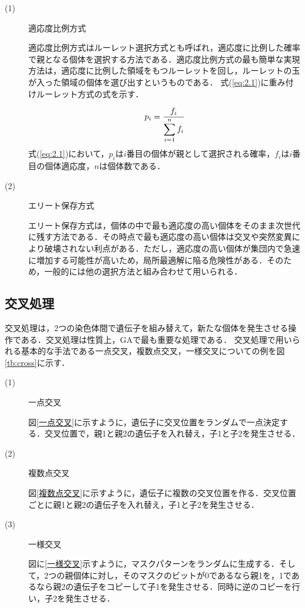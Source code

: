 \begin{description}
\item[ (1) ]適応度比例方式

適応度比例方式はルーレット選択方式とも呼ばれ，適応度に比例した確率で親となる個体を選択する方法である．適応度比例方式の最も簡単な実現方法は，適応度に比例した領域をもつルーレットを回し，ルーレットの玉が入った領域の個体を選び出すというものである．
式(\ref{eq:2.1})に重み付けルーレット方式の式を示す．



\begin{equation}
\vspace{1.0cm}
{p_i}=\frac{f_i}{\displaystyle\sum_{i=1}^{n}f_i}
\label{eq:2.1}
\vspace{-0.5cm}
\end{equation}
式(\ref{eq:2.1})において，$p_i$は$i$番目の個体が親として選択される確率，$f_i$は$i$番目の個体適応度，$n$は個体数である．

\item[ (2) ]エリート保存方式

エリート保存方式は，個体の中で最も適応度の高い個体をそのまま次世代に残す方法である．その時点で最も適応度の高い個体は交叉や突然変異により破壊されない利点がある．ただし，適応度の高い個体が集団内で急速に増加する可能性が高いため，局所最適解に陥る危険性がある．そのため，一般的には他の選択方法と組み合わせて用いられる．

\end{description}

\newpage

\subsection{交叉処理}
\label{sec2.1.4}

交叉処理は，2つの染色体間で遺伝子を組み替えて，新たな個体を発生させる操作である．交叉処理は性質上，GAで最も重要な処理である．
交叉処理で用いられる基本的な手法である一点交叉，複数点交叉，一様交叉についての例を図\ref{tb:cross}に示す．



\begin{description}
\item[ (1) ]一点交叉

図\ref{一点交叉}に示すように，遺伝子に交叉位置をランダムで一点決定する．交叉位置で，親1と親2の遺伝子を入れ替え，子1と子2を発生させる．


\item[ (2) ]複数点交叉

図\ref{複数点交叉}に示すように，遺伝子に複数の交叉位置を作る．交叉位置ごとに親1と親2の遺伝子を入れ替え，子1と子2を発生させる．

\item[ (3) ]一様交叉

図に\ref{一様交叉}示すように，マスクパターンをランダムに生成する．そして，2つの親個体に対し，そのマスクのビットが0であるなら親1を，1であるなら親2の遺伝子をコピーして子1を発生させる．同時に逆のコピーを行い，子2を発生させる．

\end{description}

